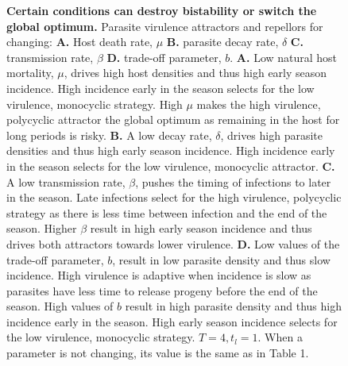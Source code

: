 \documentclass{article}
\begin{document}
\begin{figure}[hb!]
\begin{subfigure}[t]{0.45\textwidth}
  \end{subfigure}\hspace{1cm}
    \begin{subfigure}[t]{0.45\textwidth}
      \centering
  \end{subfigure}\hspace{1.5cm}
    \caption{\textbf{Certain conditions can destroy bistability or switch the global optimum.} Parasite virulence attractors and repellors for changing: \textbf{A.} Host death rate, $\mu$ \textbf{B.} parasite decay rate, $\delta$ \textbf{C.} transmission rate, $\beta$ \textbf{D.} trade-off parameter, $b$. \textbf{A.} Low natural host mortality, $\mu$, drives high host densities and thus high early season incidence. High incidence early in the season selects for the low virulence, monocyclic strategy. High $\mu$ makes the high virulence, polycyclic attractor the global optimum as remaining in the host for long periods is risky. \textbf{B.} A low decay rate, $\delta$, drives high parasite densities and thus high early season incidence. High incidence early in the season selects for the low virulence, monocyclic attractor. \textbf{C.} A low transmission rate, $\beta$, pushes the timing of infections to later in the season. Late infections select for the high virulence, polycyclic strategy as there is less time between infection and the end of the season. Higher $\beta$ result in high early season incidence and thus drives both attractors towards lower virulence.  \textbf{D.} Low values of the trade-off parameter, $b$, result in low parasite density and thus slow incidence. High virulence is adaptive when incidence is slow as parasites have less time to release progeny before the end of the season. High values of $b$ result in high parasite density and thus high incidence early in the season. High early season incidence selects for the low virulence, monocyclic strategy.
    $T = 4, t_{l} = 1$. When a parameter is not changing, its value is the same as in Table 1.
    }
\end{figure}
\end{document}
